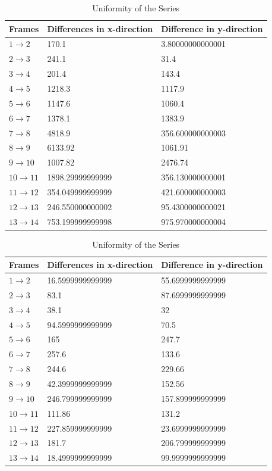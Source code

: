 \documentclass{article}
\begin{document}
\begin{table}[h!]
    \centering
    \begin{tabular}{ |p{3cm}||p{3cm}|p{3cm}|  }
     \hline Frames & Differences in x-direction & Difference in y-direction\\
 \hline 
$1 \rightarrow 2$ &170.1 & 3.80000000000001\\
$2 \rightarrow 3$ &241.1 & 31.4\\
$3 \rightarrow 4$ &201.4 & 143.4\\
$4 \rightarrow 5$ &1218.3 & 1117.9\\
$5 \rightarrow 6$ &1147.6 & 1060.4\\
$6 \rightarrow 7$ &1378.1 & 1383.9\\
$7 \rightarrow 8$ &4818.9 & 356.600000000003\\
$8 \rightarrow 9$ &6133.92 & 1061.91\\
$9 \rightarrow 10$ &1007.82 & 2476.74\\
$10 \rightarrow 11$ &1898.29999999999 & 356.130000000001\\
$11 \rightarrow 12$ &354.049999999999 & 421.600000000003\\
$12 \rightarrow 13$ &246.550000000002 & 95.4300000000021\\
$13 \rightarrow 14$ &753.199999999998 & 975.970000000004\\
 \hline
    \end{tabular}
    \caption{Uniformity of the Series}
    \label{tab:Uniformity_Series}
\end{table}

\begin{table}[h!]
    \centering
    \begin{tabular}{ |p{3cm}||p{3cm}|p{3cm}|  }
     \hline Frames & Differences in x-direction & Difference in y-direction\\
 \hline 
$1 \rightarrow 2$ &16.5999999999999 & 55.6999999999999\\
$2 \rightarrow 3$ &83.1 & 87.6999999999999\\
$3 \rightarrow 4$ &38.1 & 32\\
$4 \rightarrow 5$ &94.5999999999999 & 70.5\\
$5 \rightarrow 6$ &165 & 247.7\\
$6 \rightarrow 7$ &257.6 & 133.6\\
$7 \rightarrow 8$ &244.6 & 229.66\\
$8 \rightarrow 9$ &42.3999999999999 & 152.56\\
$9 \rightarrow 10$ &246.799999999999 & 157.899999999999\\
$10 \rightarrow 11$ &111.86 & 131.2\\
$11 \rightarrow 12$ &227.859999999999 & 23.6999999999999\\
$12 \rightarrow 13$ &181.7 & 206.799999999999\\
$13 \rightarrow 14$ &18.4999999999999 & 99.9999999999999\\
\hline
    \end{tabular}
    \caption{Uniformity of the Series}
    \label{tab:Uniformity_Series}
\end{table}
\end{document}
